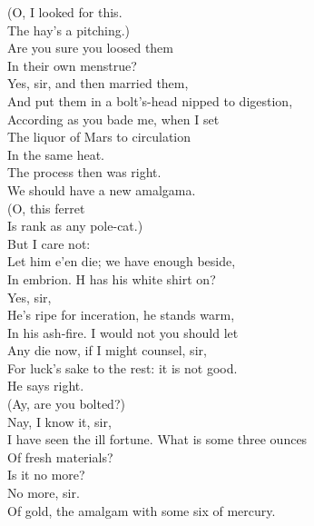 \documentclass[a4paper,oneside,12pt]{memoir}
\begin{document}
\begin{drama*}
\surlyspeaks {} (O, I looked for this.\\
The hay's a pitching.)\\
\subtlespeaks {} Are you sure you loosed them\\
In their own menstrue?\\
\facespeaks {} Yes, sir, and then married them,\\
And put them in a bolt's-head nipped to digestion,\\
According as you bade me, when I set\\
The liquor of Mars to circulation\\
In the same heat.\\
\subtlespeaks {} The process then was right.\\
We should have a new amalgama.\\
\surlyspeaks {} (O, this ferret\\
Is rank as any pole-cat.)\\
\subtlespeaks {} But I care not:\\
Let him e'en die; we have enough beside,\\
In embrion. H has his white shirt on?\\
\facespeaks {} Yes, sir,\\
He's ripe for inceration, he stands warm,\\
In his ash-fire. I would not you should let\\
Any die now, if I might counsel, sir,\\
For luck's sake to the rest: it is not good.\\
\mammonspeaks He says right.\\
\surlyspeaks {} (Ay, are you bolted?)\\
\facespeaks {} Nay, I know it, sir,\\
I have seen the ill fortune. What is some three ounces\\
Of fresh materials?\\
\mammonspeaks {} Is it no more?\\
\facespeaks {} No more, sir.\\
Of gold, the amalgam with some six of mercury.\\

\end{drama*}
\end{document}
